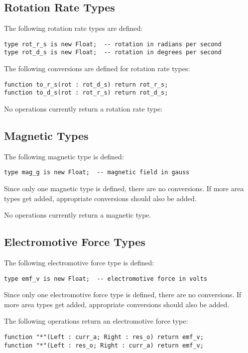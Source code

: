 \documentclass[10pt, openany]{book}
\begin{document}
\subsection{Rotation Rate Types}
The following rotation rate types are defined:
\begin{lstlisting}
type rot_r_s is new Float;  -- rotation in radians per second
type rot_d_s is new Float;  -- rotation in degrees per second
\end{lstlisting}

The following conversions are defined for rotation rate types:
\begin{lstlisting}
function to_r_s(rot : rot_d_s) return rot_r_s;
function to_d_s(rot : rot_r_s) return rot_d_s;
\end{lstlisting}

No operations currently return a rotation rate type:

\subsection{Magnetic Types}
The following magnetic type is defined:
\begin{lstlisting}
type mag_g is new Float;  -- magnetic field in gauss
\end{lstlisting}

Since only one magnetic type is defined, there are no conversions.  If more area types get added, appropriate conversions should also be added.

No operations currently return a magnetic type.

\subsection{Electromotive Force Types}
The following electromotive force type is defined:
\begin{lstlisting}
type emf_v is new Float;  -- electromotive force in volts
\end{lstlisting}

Since only one electromotive force type is defined, there are no conversions.  If more area types get added, appropriate conversions should also be added.

The following operations return an electromotive force type:
\begin{lstlisting}
function "*"(Left : curr_a; Right : res_o) return emf_v;
function "*"(Left : res_o; Right : curr_a) return emf_v;
\end{lstlisting}
\end{document}
